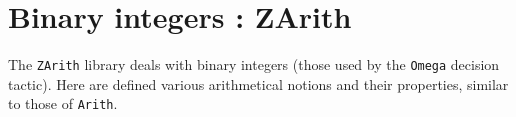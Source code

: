 \section{Binary integers : ZArith}
The {\tt ZArith} library deals with binary integers (those used
by the {\tt Omega} decision tactic).
Here are defined various arithmetical notions and their properties,
similar to those of {\tt Arith}.

